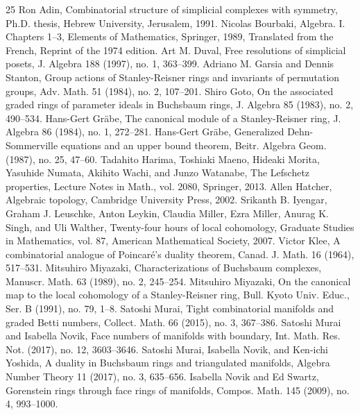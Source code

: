 \documentclass[10pt]{amsart}
\theoremstyle{definition}
\begin{document}
\begin{thebibliography}{25}
 Ron Adin, Combinatorial structure of simplicial complexes with symmetry, Ph.D. thesis, Hebrew University, Jerusalem, 1991.
 Nicolas Bourbaki, Algebra. I. Chapters 1–3, Elements of Mathematics, Springer, 1989, Translated from the French, Reprint of the 1974 edition.
 Art M. Duval, Free resolutions of simplicial posets, J. Algebra 188 (1997), no. 1, 363–399.
 Adriano M. Garsia and Dennis Stanton, Group actions of Stanley-Reisner rings and invariants of permutation groups, Adv. Math. 51 (1984), no. 2, 107–201.
 Shiro Goto, On the associated graded rings of parameter ideals in Buchsbaum rings, J. Algebra 85 (1983), no. 2, 490–534.
 Hans-Gert Gräbe, The canonical module of a Stanley-Reisner ring, J. Algebra 86 (1984), no. 1, 272–281.
 Hans-Gert Gräbe, Generalized Dehn-Sommerville equations and an upper bound theorem, Beitr. Algebra Geom. (1987), no. 25, 47–60.
 Tadahito Harima, Toshiaki Maeno, Hideaki Morita, Yasuhide Numata, Akihito Wachi, and Junzo Watanabe, The Lefschetz properties, Lecture Notes in Math., vol. 2080, Springer, 2013.
 Allen Hatcher, Algebraic topology, Cambridge University Press, 2002.
 Srikanth B. Iyengar, Graham J. Leuschke, Anton Leykin, Claudia Miller, Ezra Miller, Anurag K. Singh, and Uli Walther, Twenty-four hours of local cohomology, Graduate Studies in Mathematics, vol. 87, American Mathematical Society, 2007.
 Victor Klee, A combinatorial analogue of Poincaré’s duality theorem, Canad. J. Math. 16 (1964), 517–531.
 Mitsuhiro Miyazaki, Characterizations of Buchsbaum complexes, Manuscr. Math. 63 (1989), no. 2, 245–254.
 Mitsuhiro Miyazaki, On the canonical map to the local cohomology of a Stanley-Reisner ring, Bull. Kyoto Univ. Educ., Ser. B (1991), no. 79, 1–8.
 Satoshi Murai, Tight combinatorial manifolds and graded Betti numbers, Collect. Math. 66 (2015), no. 3, 367–386.
 Satoshi Murai and Isabella Novik, Face numbers of manifolds with boundary, Int. Math. Res. Not. (2017), no. 12, 3603–3646.
 Satoshi Murai, Isabella Novik, and Ken-ichi Yoshida, A duality in Buchsbaum rings and triangulated manifolds, Algebra Number Theory 11 (2017), no. 3, 635–656.
 Isabella Novik and Ed Swartz, Gorenstein rings through face rings of manifolds, Compos. Math. 145 (2009), no. 4, 993–1000.

\end{thebibliography}
\end{document}
